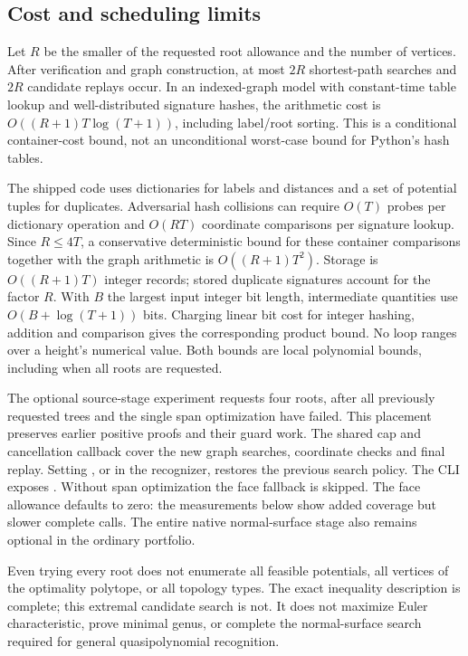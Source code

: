 \subsection{Cost and scheduling limits}

Let $R$ be the smaller of the requested root allowance and the number of
vertices. After verification and graph construction, at most $2R$
shortest-path searches and $2R$ candidate replays occur. In an indexed-graph
model with constant-time table lookup and well-distributed signature hashes,
the arithmetic cost is $O((R+1)T\log(T+1))$, including label/root sorting.
This is a conditional container-cost bound, not an unconditional worst-case
bound for Python's hash tables.

The shipped code uses dictionaries for labels and distances and a set of
potential tuples for duplicates. Adversarial hash collisions can require
$O(T)$ probes per dictionary operation and $O(RT)$ coordinate comparisons
per signature lookup. Since $R\leq4T$, a conservative deterministic bound
for these container comparisons together with the graph arithmetic is
$O((R+1)T^2)$. Storage is $O((R+1)T)$ integer records; stored duplicate
signatures account for the factor $R$. With $B$ the largest input integer
bit length, intermediate quantities use $O(B+\log(T+1))$ bits. Charging
linear bit cost for integer hashing, addition and comparison gives the
corresponding product bound. No loop ranges over a height's numerical
value. Both bounds are local polynomial bounds, including when all roots
are requested.

The optional source-stage experiment requests four roots, after all
previously requested trees and the single span optimization have failed.
This placement preserves earlier positive proofs and their guard work.
The shared cap and cancellation callback cover the new graph searches,
coordinate checks and final replay. Setting , or
 in the recognizer, restores the
previous search policy. The CLI exposes .
Without span optimization the face fallback is skipped. The face allowance defaults to zero: the measurements below show added
coverage but slower complete calls. The entire native normal-surface stage
also remains optional in the ordinary portfolio.

Even trying every root does not enumerate all feasible potentials, all
vertices of the optimality polytope, or all topology types. The exact
inequality description is complete; this extremal candidate search is not.
It does not maximize Euler characteristic, prove minimal genus, or complete
the normal-surface search required for general quasipolynomial recognition.


